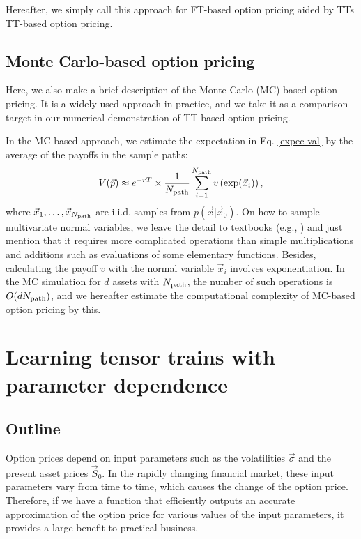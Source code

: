 Hereafter, we simply call this approach for FT-based option pricing aided by TTs TT-based option pricing.

\subsection{Monte Carlo-based option pricing}

Here, we also make a brief description of the Monte Carlo (MC)-based option pricing.
It is a widely used approach in practice, and we take it as a comparison target in our numerical demonstration of TT-based option pricing.

In the MC-based approach, we estimate the expectation in Eq. \eqref{expec val} by the average of the payoffs in the sample paths:
\begin{equation}
    V(\vec{p})\approx e^{-rT} \times \frac{1}{N_{\rm path}} \sum_{i=1}^{N_{\rm path}} v\left(\exp(\vec{x}_i)\right),
\end{equation}
where $\vec{x}_1,\ldots,\vec{x}_{N_{\rm path}}$ are i.i.d. samples from $p(\vec{x}|\vec{x}_0)$.
On how to sample multivariate normal variables, we leave the detail to textbooks (e.g., \cite{glasserman2004monte}) and just mention that it requires more complicated operations than simple multiplications and additions such as evaluations of some elementary functions.
Besides, calculating the payoff $v$ with the normal variable $\vec{x}_i$ involves exponentiation.
In the MC simulation for $d$ assets with $N_{\rm path}$, the number of such operations is $O(d N_{\rm path})$, and we hereafter estimate the computational complexity of MC-based option pricing by this.


\section{Learning tensor trains with parameter dependence}


\subsection{Outline}
Option prices depend on input parameters such as the volatilities $\vec{\sigma}$ and the present asset prices $\vec{S}_0$. 
In the rapidly changing financial market, these input parameters vary from time to time, which causes the change of the option price.
Therefore, if we have a function that efficiently outputs an accurate approximation of the option price for various values of the input parameters, it provides a large benefit to practical business.

